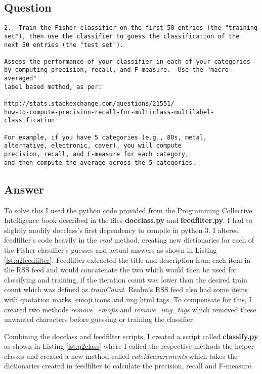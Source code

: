 \documentclass[letterpaper,11pt]{article}
\begin{document}
\subsection*{Question}

\begin{verbatim}
2.  Train the Fisher classifier on the first 50 entries (the "training
set"), then use the classifier to guess the classification of the
next 50 entries (the "test set").

Assess the performance of your classifier in each of your categories
by computing precision, recall, and F-measure.  Use the "macro-averaged"
label based method, as per:

http://stats.stackexchange.com/questions/21551/
how-to-compute-precision-recall-for-multiclass-multilabel-classification

For example, if you have 5 categories (e.g., 80s, metal,
alternative, electronic, cover), you will compute
precision, recall, and F-measure for each category,
and then compute the average across the 5 categories.
\end{verbatim}

\subsection*{Answer}

To solve this I used the python code provided from the Programming Collective Intelligence book described in the files \textbf{docclass.py} and \textbf{feedfilter.py}. I had to slightly modify docclass's first dependency to compile in python 3. I altered feedfilter's code heavily in the \textit{read} method, creating new dictionaries for each of the Fisher classifier's guesses and actual answers as shown in Listing \ref{lst:q2feedfilter}. Feedfilter extracted the title and description from each item in the RSS feed and would concatenate the two which would then be used for classifying and training, if the iteration count was lower than the desired train count which was defined as \textit{trainCount}. Realm's RSS feed also had some items with quotation marks, emoji icons and img html tags. To compensate for this, I created two methods \textit{remove\_emojis} and \textit{remove\_img\_tags} which removed these unwanted characters before guessing or training the classifier.

Combining the docclass and feedfilter scripts, I created a script called \textbf{classify.py} as shown in Listing \ref{lst:q2class} where I called the respective methods the helper classes and created a new method called \textit{calcMeasurements} which takes the dictionaries created in feedfilter to calculate the precision, recall and F-measure.
\end{document}
